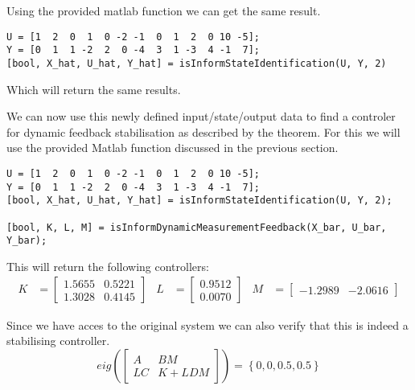Using the provided matlab function  we can get the same result.
\begin{lstlisting}
U = [1  2  0  1  0 -2 -1  0  1  2  0 10 -5];
Y = [0  1  1 -2  2  0 -4  3  1 -3  4 -1  7];
[bool, X_hat, U_hat, Y_hat] = isInformStateIdentification(U, Y, 2)
\end{lstlisting}
Which will return the same results.


We can now use this newly defined input/state/output data to find a controler for dynamic feedback stabilisation as described by the theorem. For this we will use the provided Matlab function discussed in the previous section.
\begin{lstlisting}
U = [1  2  0  1  0 -2 -1  0  1  2  0 10 -5];
Y = [0  1  1 -2  2  0 -4  3  1 -3  4 -1  7];
[bool, X_hat, U_hat, Y_hat] = isInformStateIdentification(U, Y, 2);

[bool, K, L, M] = isInformDynamicMeasurementFeedback(X_bar, U_bar, Y_bar);
\end{lstlisting}
This will return the following controllers:
\begin{align*}
K &= \begin{bmatrix} 1.5655&0.5221\\1.3028&0.4145 \end{bmatrix} &
L &= \begin{bmatrix} 0.9512\\0.0070 \end{bmatrix} &
M &= \begin{bmatrix} -1.2989&-2.0616 \end{bmatrix} 
\end{align*}

Since we have acces to the original system we can also verify that this is indeed a stabilising controller.
\[ eig\left( \begin{bmatrix} A & BM \\ LC & K + LDM \end{bmatrix} \right)  = \left\{ 0,0,0.5,0.5 \right\}\]
